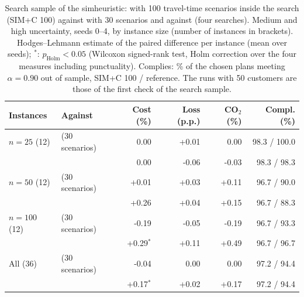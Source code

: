 \begin{table}[htbp]
\centering
\caption{Search sample of the simheuristic: \mSIM{} with 100 travel-time scenarios inside the search (SIM+C 100) against \mSIM{} with 30 scenarios and against \mCAL{} (four searches). Medium and high uncertainty, seeds 0--4, by instance size (number of instances in brackets). Hodges--Lehmann estimate of the paired difference per instance (mean over seeds); $^*$: $p_{\mathrm{Holm}}<0.05$ (Wilcoxon signed-rank test, Holm correction over the four measures including punctuality). Complies: \% of the chosen plans meeting $\alpha=0.90$ out of sample, SIM+C 100 / reference. The runs with 50 customers are those of the first check of the search sample.}
\label{tab:simc100-full}
\small\setlength{\tabcolsep}{4pt}
\begin{tabular}{@{}l l r r r r@{}}
\toprule
Instances & Against & Cost (\%) & Loss (p.p.) & CO$_2$ (\%) & Compl. (\%) \\
\midrule
$n=25$ (12) & \mSIM{} (30 scenarios) & 0.00 & +0.01 & 0.00 & 98.3 / 100.0 \\
 & \mCAL{} & 0.00 & -0.06 & -0.03 & 98.3 / 98.3 \\
\midrule
$n=50$ (12) & \mSIM{} (30 scenarios) & +0.01 & +0.03 & +0.11 & 96.7 / 90.0 \\
 & \mCAL{} & +0.26 & +0.04 & +0.15 & 96.7 / 88.3 \\
\midrule
$n=100$ (12) & \mSIM{} (30 scenarios) & -0.19 & -0.05 & -0.19 & 96.7 / 93.3 \\
 & \mCAL{} & +0.29$^*$ & +0.11 & +0.49 & 96.7 / 96.7 \\
\midrule
All (36) & \mSIM{} (30 scenarios) & -0.04 & 0.00 & 0.00 & 97.2 / 94.4 \\
 & \mCAL{} & +0.17$^*$ & +0.02 & +0.17 & 97.2 / 94.4 \\
\bottomrule
\end{tabular}
\end{table}
